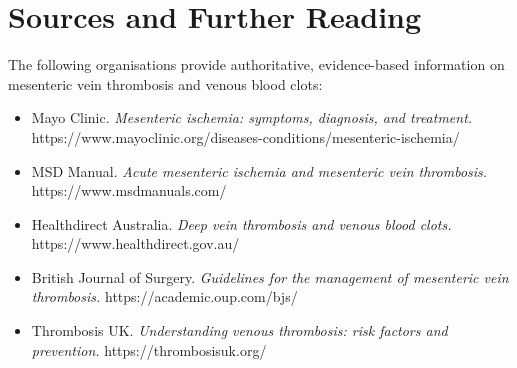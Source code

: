 \section*{Sources and Further Reading}
The following organisations provide authoritative, evidence-based information on mesenteric vein thrombosis and venous blood clots:
\begin{itemize}
    \item Mayo Clinic. \textit{Mesenteric ischemia: symptoms, diagnosis, and treatment.} https://www.mayoclinic.org/diseases-conditions/mesenteric-ischemia/
    \item MSD Manual. \textit{Acute mesenteric ischemia and mesenteric vein thrombosis.} https://www.msdmanuals.com/
    \item Healthdirect Australia. \textit{Deep vein thrombosis and venous blood clots.} https://www.healthdirect.gov.au/
    \item British Journal of Surgery. \textit{Guidelines for the management of mesenteric vein thrombosis.} https://academic.oup.com/bjs/
    \item Thrombosis UK. \textit{Understanding venous thrombosis: risk factors and prevention.} https://thrombosisuk.org/
\end{itemize}
